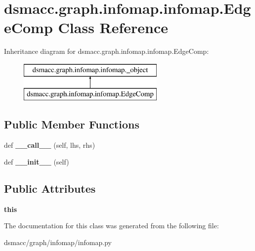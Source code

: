 \hypertarget{classdsmacc_1_1graph_1_1infomap_1_1infomap_1_1EdgeComp}{}\section{dsmacc.\+graph.\+infomap.\+infomap.\+Edge\+Comp Class Reference}
\label{classdsmacc_1_1graph_1_1infomap_1_1infomap_1_1EdgeComp}
Inheritance diagram for dsmacc.\+graph.\+infomap.\+infomap.\+Edge\+Comp\+:\begin{figure}[H]
\begin{center}
\leavevmode
\includegraphics[height=2.000000cm]{classdsmacc_1_1graph_1_1infomap_1_1infomap_1_1EdgeComp}
\end{center}
\end{figure}
\subsection*{Public Member Functions}
\begin{DoxyCompactItemize}
\item 
\mbox{\label{classdsmacc_1_1graph_1_1infomap_1_1infomap_1_1EdgeComp_a9e3be47fc2d91411d824088f518b3893}} 
def {\bfseries \+\_\+\+\_\+call\+\_\+\+\_\+} (self, lhs, rhs)
\item 
\mbox{\label{classdsmacc_1_1graph_1_1infomap_1_1infomap_1_1EdgeComp_a3c9fdf77174359f0ec2921fa3b65b56c}} 
def {\bfseries \+\_\+\+\_\+init\+\_\+\+\_\+} (self)
\end{DoxyCompactItemize}
\subsection*{Public Attributes}
\begin{DoxyCompactItemize}
\item 
\mbox{\label{classdsmacc_1_1graph_1_1infomap_1_1infomap_1_1EdgeComp_aae81e1eb5222a34cd5c87d0fee77d5f7}} 
{\bfseries this}
\end{DoxyCompactItemize}


The documentation for this class was generated from the following file\+:\begin{DoxyCompactItemize}
\item 
dsmacc/graph/infomap/infomap.\+py\end{DoxyCompactItemize}
